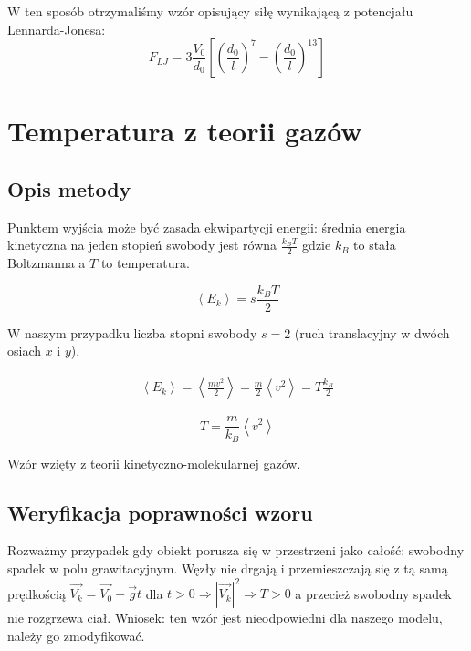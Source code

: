 \documentclass[12pt, letterpaper]{report}
\begin{document}
    W ten sposób otrzymaliśmy wzór opisujący siłę wynikającą z potencjału Lennarda-Jonesa:
    \begin{equation}
        F_{LJ} = 3\frac{V_0}{d_0} \left[ \left(\frac{d_0}{l}\right)^{7} - \left(\frac{d_0}{l}\right)^{13} \right]
    \end{equation}

    \section{Temperatura z teorii gazów}
    \subsection{Opis metody}
    Punktem wyjścia może być zasada ekwipartycji energii: średnia energia kinetyczna na jeden stopień swobody jest równa 
    $\frac{k_{B}T}{2}$ gdzie $k_{B}$ to stała Boltzmanna a $T$ to temperatura.

    \begin{equation}
        \left< E_{k} \right> = s \frac{k_{B}T}{2}
    \end{equation}

    W naszym przypadku liczba stopni swobody $s = 2$ (ruch translacyjny w dwóch osiach $x$ i $y$).

    \begin{align*}
        \left< E_{k} \right> = \left< \frac{m v^{2}}{2} \right> = \frac{m}{2} \left< v^{2} \right> = T \frac{k_{B}}{2}
    \end{align*}

    \begin{equation}
        T = \frac{m}{k_{B}} \left< v^{2} \right>
    \end{equation}

    Wzór wzięty z teorii kinetyczno-molekularnej gazów.

    \subsection{Weryfikacja poprawności wzoru}
    Rozważmy przypadek gdy obiekt porusza się w przestrzeni jako całość: swobodny spadek w polu grawitacyjnym.
    Węzły nie drgają i przemieszczają się z tą samą prędkością 
    $\vec{V_k} = \vec{V_0} + \vec{g}t$ dla $t > 0  \Rightarrow  |\vec{V_k}|^2  \Rightarrow  T > 0$ a 
    przecież swobodny spadek nie rozgrzewa ciał. 
    Wniosek: ten wzór jest nieodpowiedni dla naszego modelu, należy go zmodyfikować.
    
\end{document}
